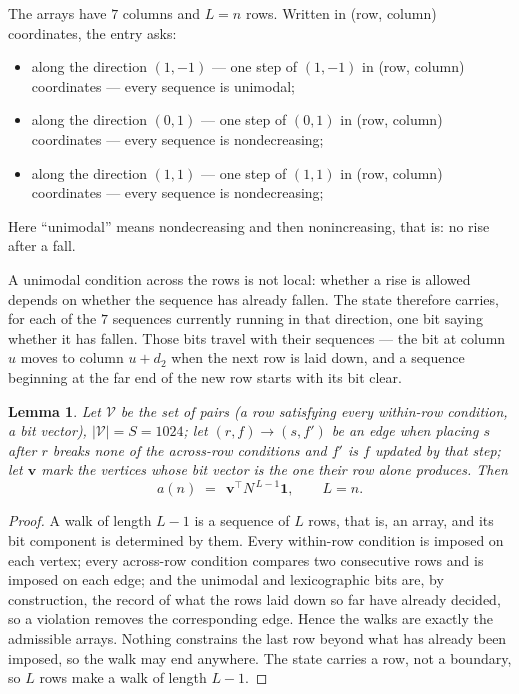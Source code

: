 \documentclass[11pt,a4paper]{article}
\theoremstyle{plain}
\newtheorem{lemma}[theorem]{Lemma}
\theoremstyle{definition}
\begin{document}
The arrays have $7$ columns and $L=n$ rows. Written in (row, column)
coordinates, the entry asks:
\begin{itemize}
\item along the direction $(1,-1)$ --- one step of $(1,-1)$ in (row, column) coordinates --- every sequence is unimodal;
\item along the direction $(0,1)$ --- one step of $(0,1)$ in (row, column) coordinates --- every sequence is nondecreasing;
\item along the direction $(1,1)$ --- one step of $(1,1)$ in (row, column) coordinates --- every sequence is nondecreasing;
\end{itemize}
Here ``unimodal'' means nondecreasing and then nonincreasing, that is: no rise after a fall.

A unimodal condition across the rows is not local: whether a
rise is allowed depends on whether the sequence has already fallen. The state therefore
carries, for each of the $7$ sequences currently running in that direction, one bit saying
whether it has fallen. Those bits travel with their sequences --- the bit at column $u$
moves to column $u+d_2$ when the next row is laid down, and a sequence beginning at the
far end of the new row starts with its bit clear.

\begin{lemma}\label{lem:walk}
Let $\mathcal V$ be the set of pairs (a row satisfying every within-row condition, a
bit vector), $|\mathcal V|=S=1024$; let $(r,f)\to(s,f')$ be an edge when placing $s$ after $r$
breaks none of the across-row conditions and $f'$ is $f$ updated by that step; let
$\mathbf{v}$ mark the vertices whose bit vector is the one their row alone produces.
Then
\[
a(n)\;=\;\,\mathbf{v}^{\!\top}N^{\,L-1}\mathbf{1},\qquad L=n.
\]
\end{lemma}

\begin{proof}
A walk of length $L-1$ is a sequence of $L$ rows, that is, an array, and its bit component
is determined by them. Every within-row condition is imposed on each vertex; every
across-row condition compares two consecutive rows and is imposed on each edge; and the
unimodal and lexicographic bits are, by construction, the record of what the rows laid down
so far have already decided, so a violation removes the corresponding edge. Hence the walks
are exactly the admissible arrays. Nothing constrains the last row beyond what has already
been imposed, so the walk may end anywhere. The state carries a row, not a boundary, so
$L$ rows make a walk of length $L-1$.
\end{proof}
\end{document}
